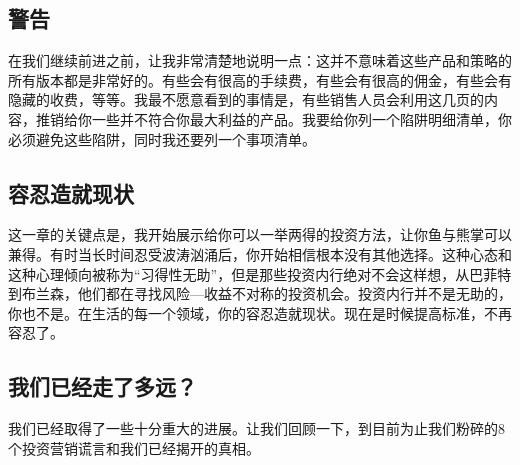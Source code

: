 \subsection{警告}

在我们继续前进之前，让我非常清楚地说明一点：这并不意味着这些产品和策略的所有版本都是非常好的。有些会有很高的手续费，有些会有很高的佣金，有些会有隐藏的收费，等等。我最不愿意看到的事情是，有些销售人员会利用这几页的内容，推销给你一些并不符合你最大利益的产品。我要给你列一个陷阱明细清单，你必须避免这些陷阱，同时我还要列一个事项清单。

\subsection{容忍造就现状}

这一章的关键点是，我开始展示给你可以一举两得的投资方法，让你鱼与熊掌可以兼得。有时当长时间忍受波涛汹涌后，你开始相信根本没有其他选择。这种心态和这种心理倾向被称为“习得性无助”，但是那些投资内行绝对不会这样想，从巴菲特到布兰森，他们都在寻找风险—收益不对称的投资机会。投资内行并不是无助的，你也不是。在生活的每一个领域，你的容忍造就现状。现在是时候提高标准，不再容忍了。

\subsection{我们已经走了多远？}

我们已经取得了一些十分重大的进展。让我们回顾一下，到目前为止我们粉碎的8个投资营销谎言和我们已经揭开的真相。

